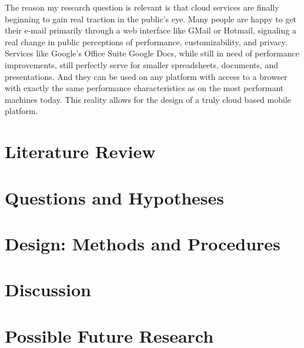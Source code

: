 \documentclass[12pt,oneside,letterpaper,titlepage]{report}
\begin{document}

The reason my research question is relevant is that cloud services are finally
beginning to gain real traction in the public's eye.  Many people are happy to
get their e-mail primarily through a web interface like GMail or Hotmail,
signaling a real change in public perceptions of performance, customizability,
and privacy.  Services like Google's Office Suite Google Docs, while still in
need of performance improvements, still perfectly serve for smaller
spreadsheets, documents, and presentations.  And they can be used on any
platform with access to a browser with exactly the same performance
characteristics as on the most performant machines today.  This reality allows
for the design of a truly cloud based mobile platform.

\chapter{Literature Review}

\newpage

  

\chapter{Questions and Hypotheses}

\newpage

  

\chapter{Design: Methods and Procedures}

\newpage

  

\chapter{Discussion}

\newpage

  

\chapter{Possible Future Research}

\newpage
\end{document}
